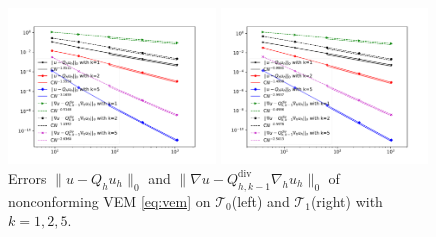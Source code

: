 \documentclass[10pt]{amsart}
\renewcommand{\div}{\operatorname{div}}
\numberwithin{equation}{section}
\begin{document}
\begin{figure}[htbp]
\centering
\begin{minipage}[t]{0.49\linewidth}
\centering
\includegraphics[width=5.5cm]{./figures/ncvem_convex.pdf}
\end{minipage}%
\begin{minipage}[t]{0.49\linewidth}
\centering
\includegraphics[width=5.5cm]{./figures/ncvem_nonconvex.pdf}
\end{minipage}%
\centering
\caption{Errors $\|u - Q_h u_h\|_0$ and $\|\nabla u - Q_{h, k-1}^{\div}\nabla_h u_h\|_0$ 
of nonconforming VEM \eqref{eq:vem} on 
$\mathcal T_0$(left) and $\mathcal T_1$(right) with $k=1, 2, 5$.}
\label{fig:rate1}
\end{figure}
\end{document}
